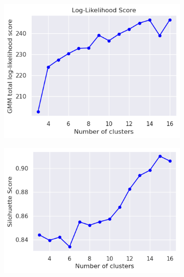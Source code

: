         \begin{figure}[H]
            \centering
            \begin{subfigure}[c]{0.47\textwidth}
                \centering
                \includegraphics[width=\textwidth]{../figures/plots/section3/gmm_total_log-likelihood_score.png}
                \caption{}
                \label{fig:tsne_kmeans}
            \end{subfigure}
            \hfill
            \begin{subfigure}[c]{0.47\textwidth}
                \centering
                \includegraphics[width=\textwidth]{../figures/plots/section3/gmm_silohuette_score.png}
                \caption{}
                \label{fig:tsne_gmm}
            \end{subfigure}
            \vspace{-0.1cm}
            \caption{}
            \label{fig:}
        \end{figure}
    
